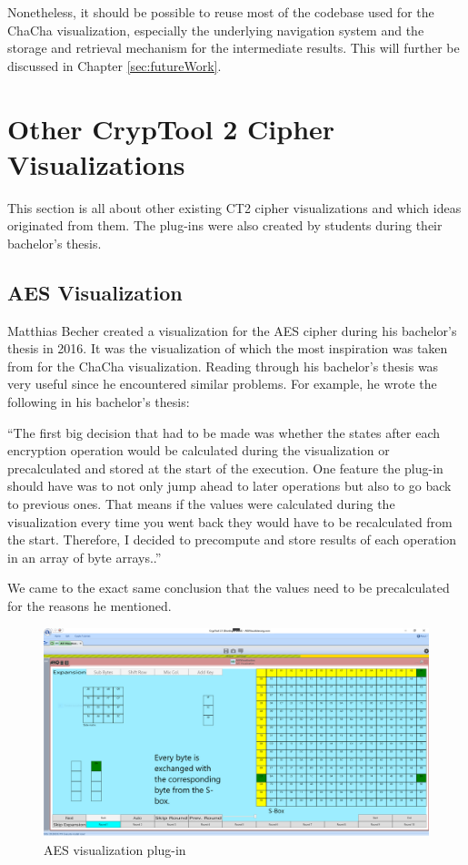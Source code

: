 Nonetheless, it should be possible to reuse most of the codebase used for the ChaCha visualization, especially the underlying navigation system and the storage and retrieval mechanism for the intermediate results. This will further be discussed in Chapter \ref{sec:futureWork}.

\section{Other CrypTool 2 Cipher Visualizations}
\label{sec:otherCT2CipherVisualizations}

This section is all about other existing CT2 cipher visualizations and which ideas originated from them. The plug-ins were also created by students during their bachelor's thesis.

\subsection{AES Visualization}
\label{sec:aesVisualization}

Matthias Becher created a visualization for the AES cipher during his bachelor's thesis in 2016. It was the visualization of which the most inspiration was taken from for the ChaCha visualization. Reading through his bachelor's thesis was very useful since he encountered similar problems. For example, he wrote the following in his bachelor's thesis:

``The first big decision that had to be made was whether the states after each encryption operation would be calculated during the visualization or precalculated and stored at the start of the execution. One feature the plug-in should have was to not only jump ahead to later operations but also to go back to previous ones. That means if the values were calculated during the visualization every time you went back they would have to be recalculated from the start. Therefore, I decided to precompute and store results of each operation in an array of byte arrays..'' \cite{aesthesis}

We came to the exact same conclusion that the values need to be precalculated for the reasons he mentioned.

\begin{figure}
\centering
\includegraphics[width=\textwidth]{figures/ct2/aes.png}
\caption{AES visualization plug-in}
\label{fig:aes}
\end{figure}

